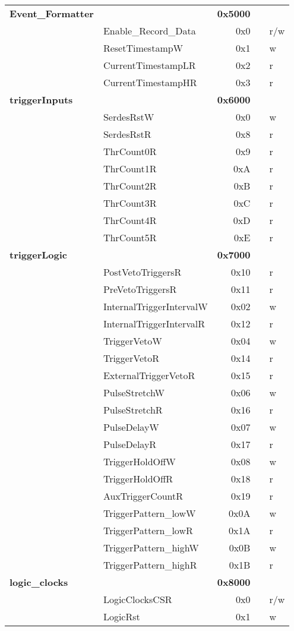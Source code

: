 \begin{table}
\begin{tabular}{|l|l|r|l|l|}
\textbf{Event\_Formatter} & \textbf{} & \multicolumn{1}{l|}{\textbf{0x5000}} & \textbf{} & \textbf{} \\
 & Enable\_Record\_Data & 0x0 &  & r/w \\
 & ResetTimestampW & 0x1 &  & w \\
 & CurrentTimestampLR & 0x2 &  & r \\
 & CurrentTimestampHR & 0x3 &  & r \\ \hline
\textbf{triggerInputs} & \textbf{} & \multicolumn{1}{l|}{\textbf{0x6000}} & \textbf{} & \textbf{} \\
 & SerdesRstW & 0x0 &  & w \\
 & SerdesRstR & 0x8 &  & r \\
 & ThrCount0R & 0x9 &  & r \\
 & ThrCount1R & 0xA &  & r \\
 & ThrCount2R & 0xB &  & r \\
 & ThrCount3R & 0xC &  & r \\
 & ThrCount4R & 0xD &  & r \\
 & ThrCount5R & 0xE &  & r \\ \hline
\textbf{triggerLogic} & \textbf{} & \multicolumn{1}{l|}{\textbf{0x7000}} & \textbf{} & \textbf{} \\
 & PostVetoTriggersR & 0x10 &  & r \\
 & PreVetoTriggersR & 0x11 &  & r \\
 & InternalTriggerIntervalW & 0x02 &  & w \\
 & InternalTriggerIntervalR & 0x12 &  & r \\
 & TriggerVetoW & 0x04 &  & w \\
 & TriggerVetoR & 0x14 &  & r \\
 & ExternalTriggerVetoR & 0x15 &  & r \\
 & PulseStretchW & 0x06 &  & w \\
 & PulseStretchR & 0x16 &  & r \\
 & PulseDelayW & 0x07 &  & w \\
 & PulseDelayR & 0x17 &  & r \\
 & TriggerHoldOffW & 0x08 &  & w \\
 & TriggerHoldOffR & 0x18 &  & r \\
 & AuxTriggerCountR & 0x19 &  & r \\
 & TriggerPattern\_lowW & 0x0A &  & w \\
 & TriggerPattern\_lowR & 0x1A &  & r \\
 & TriggerPattern\_highW & 0x0B &  & w \\
 & TriggerPattern\_highR & 0x1B &  & r \\ \hline
\textbf{logic\_clocks} & \textbf{} & \multicolumn{1}{l|}{\textbf{0x8000}} & \textbf{} & \textbf{} \\
 & LogicClocksCSR & 0x0 &  & r/w \\
 & LogicRst & 0x1 &  & w \\ \hline
\end{tabular}
\end{table}

